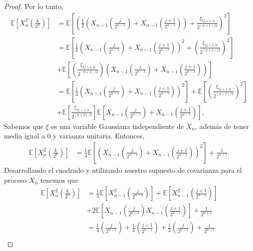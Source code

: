 \begin{proof}
Por lo tanto, 
	\begin{align*}
		\mathbb{E} \left[ X_n^2 \left( \frac{k}{2^n} \right) \right] & = \mathbb{E} \left[ \left( \frac{1}{2} \left( X_{n-1} \left( \frac{j}{2^{n-1}} \right) + X_{n-1} \left( \frac{j + 1}{2^{n-1}} \right) \right) + \frac{\xi_{2j+1, n}}{2^{(n+1)/2}} \right)^2 \right] \\
		& = \mathbb{E} \left[ \frac{1}{4} \left( X_{n-1} \left( \frac{j}{2^{n-1}} \right) + X_{n-1} \left( \frac{j + 1}{2^{n-1}} \right) \right)^2 + \left( \frac{\xi_{2j+1, n}}{2^{(n+1)/2}} \right)^2 \right] \\
		& + \mathbb{E} \left[ \left(\frac{\xi_{2j+1, n}}{2^{(n+3)/2}}\right) \left( X_{n-1} \left( \frac{j}{2^{n-1}} \right) + X_{n-1} \left( \frac{j + 1}{2^{n-1}} \right) \right) \right] \\	
		& = \mathbb{E} \left[ \frac{1}{4} \left( X_{n-1} \left( \frac{j}{2^{n-1}} \right) + X_{n-1} \left( \frac{j + 1}{2^{n-1}} \right) \right)^2 \right] + \mathbb{E} \left[ \left( \frac{\xi_{2j+1, n}}{2^{(n+1)/2}} \right)^2 \right] \\
		& + \mathbb{E} \left[\frac{\xi_{2j+1, n}}{2^{(n+3)/2}} \right] \mathbb{E} \left[ X_{n-1} \left( \frac{j}{2^{n-1}} \right) + X_{n-1} \left( \frac{j + 1}{2^{n-1}} \right) \right],
	\end{align*}
Sabemos que $\xi$ es una variable Gaussiana independiente de $X_n$, además de tener media igual a $0$ y varianza unitaria. Entonces,
	\begin{align*}
		\mathbb{E} \left[ X_n^2 \left( \frac{k}{2^n} \right) \right] & = \frac{1}{4} \mathbb{E} \left[ \left( X_{n-1} \left( \frac{j}{2^{n-1}} \right) + X_{n-1} \left( \frac{j + 1}{2^{n-1}} \right) \right)^2 \right] + \frac{1}{2^{n+1}}.
	\end{align*}
Desarrollando el cuadrado y utilizando nuestro supuesto de covarianza para el proceso $X_n$ tenemos que
	\begin{align*}
	\mathbb{E} \left[ X_n^2 \left( \frac{k}{2^n} \right) \right] & = \frac{1}{4} \mathbb{E} \left[ X_{n-1}^2 \left( \frac{j}{2^{n-1}}  \right) \right] +  \mathbb{E} \left[ X_{n-1}^2 \left( \frac{j+1}{2^{n-1}} \right) \right] \\
	& + 2\mathbb{E} \left[ X_{n-1}\left( \frac{j}{2^{n-1}}  \right) X_{n-1} \left( \frac{j+1}{2^{n-1}} \right) \right] + \frac{1}{2^{n+1}} \\
	& = \frac{1}{4} \left( \frac{j}{2^{n-1}} \right) + \frac{1}{4} \left( \frac{j+1}{2^{n-1}} \right) + \frac{1}{2} \left( \frac{j}{2^{n-1}} \right) + \frac{1}{2^{n+1}} \\

\end{align*}
\end{proof}
